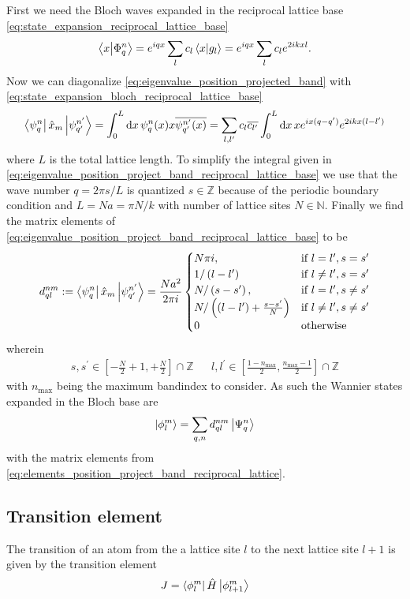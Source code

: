 First we need the Bloch waves expanded in the reciprocal lattice base
\cref{eq:state_expansion_reciprocal_lattice_base}
\begin{equation}
  \bra{x}\ket{\Phi^n_q}
  =e^{iqx}\sum_lc_l\bra{x}\ket{g_l}
  =e^{iqx}\sum_lc_le^{2ikxl}
  \label{eq:state_expansion_bloch_reciprocal_lattice_base}.
\end{equation}
Now we can diagonalize \cref{eq:eigenvalue_position_projected_band} with
\cref{eq:state_expansion_bloch_reciprocal_lattice_base}
\begin{equation}
  \bra{\psi^n_{q}}\hat{x}_m\ket{\psi^{n^\prime}_{q^\prime}}
  =\int_0^L\dd{x}\psi^n_{q}(x)x\overline{\psi^{n^\prime}_{q^\prime}(x)}
  =\sum_{l,l^\prime}c_l\overline{c_{l^\prime}}\int_0^L\dd{x}xe^{ix(q-q^\prime)}e^{2ikx(l-l^\prime)}
  \label{eq:eigenvalue_position_project_band_reciprocal_lattice_base}
\end{equation}
where $L$ is the total lattice length. To simplify the integral given in
\cref{eq:eigenvalue_position_project_band_reciprocal_lattice_base} we use
that the wave number $q=2\pi s/L$ is quantized $s\in\mathbb{Z}$ because of
the periodic boundary condition and $L=Na=\pi N/k$ with number of lattice
sites $N\in\mathbb{N}$. Finally we find the matrix elements of
\cref{eq:eigenvalue_position_project_band_reciprocal_lattice_base} to be
\begin{equation}
  d^{nm}_{ql}
  :=
  \bra{\psi^n_{q}}\hat{x}_m\ket{\psi^{n^\prime}_{q^\prime}}
  =
  \frac{Na^2}{2\pi i}
  \begin{cases}
    N\pi i,
    & \text{if } l=l^\prime,s=s^\prime\\
    1/\left(l-l^\prime\right)
    & \text{if } l\neq l^\prime,s=s^\prime\\
    N/\left(s-s^\prime\right),
    & \text{if } l=l^\prime,s\neq s^\prime\\
    N/\left((l-l^\prime)+\frac{s-s^\prime}{N}\right)
    & \text{if } l\neq l^\prime,s\neq s^\prime\\
    0 & \text{otherwise}
  \end{cases}
  \label{eq:elements_position_project_band_reciprocal_lattice}
\end{equation}
wherein
\begin{align}
  s,s^\prime\in\left[-\frac{N}{2}+1,+\frac{N}{2}\right]\cap\mathbb{Z}
  &&
  l,l^\prime\in\left[\frac{1-n_\text{max}}{2},\frac{n_\text{max}-1}{2}\right]
  \cap\mathbb{Z}
\end{align}
with $n_\text{max}$ being the maximum bandindex to consider. As such the
Wannier states expanded in the Bloch base are
\begin{equation}
  \ket{\phi^m_l}
  =\sum_{q,n}d^{nm}_{ql}\ket{\Psi^n_q}
  \label{eq:state_expansion_wannier_in_bloch_base}
\end{equation}
with the matrix elements from
\cref{eq:elements_position_project_band_reciprocal_lattice}.

\subsection{Transition element}

The transition of an atom from the a lattice site $l$ to the next lattice site
$l+1$ is given by the transition element
\begin{equation}
  J
  =\bra{\phi^m_l}\hat{H}\ket{\phi^m_{l+1}}
\end{equation}
